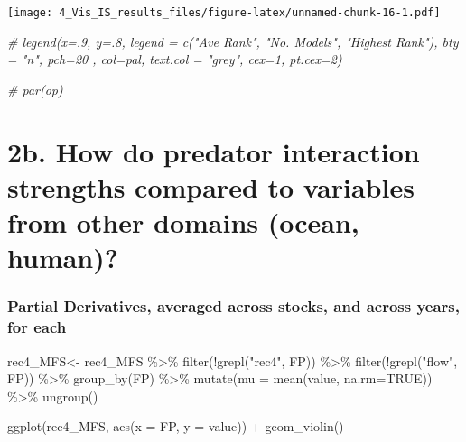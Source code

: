 \documentclass[
]{article}
\newenvironment{Shaded}{\begin{snugshade}}{\end{snugshade}}
\newcommand{\AttributeTok}[1]{\textcolor[rgb]{0.77,0.63,0.00}{#1}}
\newcommand{\CommentTok}[1]{\textcolor[rgb]{0.56,0.35,0.01}{\textit{#1}}}
\newcommand{\ConstantTok}[1]{\textcolor[rgb]{0.00,0.00,0.00}{#1}}
\newcommand{\FunctionTok}[1]{\textcolor[rgb]{0.00,0.00,0.00}{#1}}
\newcommand{\NormalTok}[1]{#1}
\newcommand{\OtherTok}[1]{\textcolor[rgb]{0.56,0.35,0.01}{#1}}
\newcommand{\SpecialCharTok}[1]{\textcolor[rgb]{0.00,0.00,0.00}{#1}}
\newcommand{\StringTok}[1]{\textcolor[rgb]{0.31,0.60,0.02}{#1}}
\begin{document}
\texttt{[image: 4\_Vis\_IS\_results\_files/figure-latex/unnamed-chunk-16-1.pdf]}

\begin{Shaded}
\begin{Highlighting}[]
\CommentTok{\# legend(x=.9, y=.8, legend = c("Ave Rank", "No. Models", "Highest Rank"), bty = "n", pch=20 , col=pal, text.col = "grey", cex=1, pt.cex=2)}


\CommentTok{\# par(op)}
\end{Highlighting}
\end{Shaded}

\hypertarget{b.-how-do-predator-interaction-strengths-compared-to-variables-from-other-domains-ocean-human-2}{%
\section{2b. How do predator interaction strengths compared to variables
from other domains (ocean,
human)?}\label{b.-how-do-predator-interaction-strengths-compared-to-variables-from-other-domains-ocean-human-2}}

\hypertarget{partial-derivatives-averaged-across-stocks-and-across-years-for-each}{%
\subsubsection{Partial Derivatives, averaged across stocks, and across
years, for
each}\label{partial-derivatives-averaged-across-stocks-and-across-years-for-each}}

\begin{Shaded}
\begin{Highlighting}[]
\NormalTok{rec4\_MFS}\OtherTok{\textless{}{-}}\NormalTok{  rec4\_MFS  }\SpecialCharTok{\%\textgreater{}\%} 
  \FunctionTok{filter}\NormalTok{(}\SpecialCharTok{!}\FunctionTok{grepl}\NormalTok{(}\StringTok{"rec4"}\NormalTok{, FP)) }\SpecialCharTok{\%\textgreater{}\%} 
  \FunctionTok{filter}\NormalTok{(}\SpecialCharTok{!}\FunctionTok{grepl}\NormalTok{(}\StringTok{"flow"}\NormalTok{, FP)) }\SpecialCharTok{\%\textgreater{}\%} 
  \FunctionTok{group\_by}\NormalTok{(FP) }\SpecialCharTok{\%\textgreater{}\%} 
  \FunctionTok{mutate}\NormalTok{(}\AttributeTok{mu =} \FunctionTok{mean}\NormalTok{(value, }\AttributeTok{na.rm=}\ConstantTok{TRUE}\NormalTok{)) }\SpecialCharTok{\%\textgreater{}\%}
  \FunctionTok{ungroup}\NormalTok{()}

\FunctionTok{ggplot}\NormalTok{(rec4\_MFS, }\FunctionTok{aes}\NormalTok{(}\AttributeTok{x =}\NormalTok{ FP, }\AttributeTok{y =}\NormalTok{ value)) }\SpecialCharTok{+} 
  \FunctionTok{geom\_violin}\NormalTok{()}
\end{Highlighting}
\end{Shaded}
\end{document}
